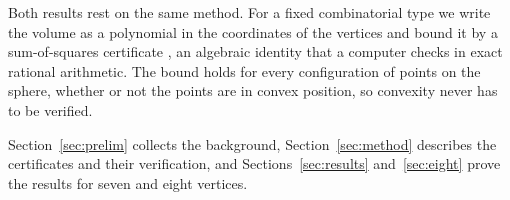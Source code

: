 Both results rest on the same method. For a fixed combinatorial type we write
the volume as a polynomial in the coordinates of the vertices and bound it by
a sum-of-squares certificate \cite{parrilo-2003}, an algebraic identity that a
computer checks in exact rational arithmetic. The bound holds for every
configuration of points on the sphere, whether or not the points are in convex
position, so convexity never has to be verified.

Section~\ref{sec:prelim} collects the background, Section~\ref{sec:method}
describes the certificates and their verification, and
Sections~\ref{sec:results} and~\ref{sec:eight} prove the results for seven and
eight vertices.
